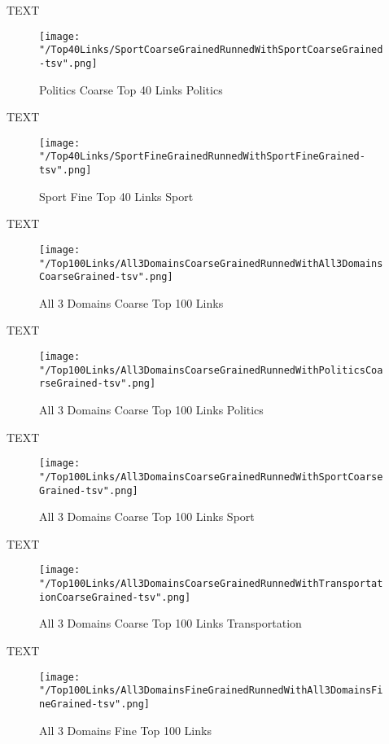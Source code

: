\documentclass[thesis=M,english]{FITthesis}[2012/10/20]
\begin{document}
	
	TEXT

	\begin{figure}\centering
		\texttt{[image: "/Top40Links/SportCoarseGrainedRunnedWithSportCoarseGrained-tsv".png]}
		\caption{Politics Coarse Top 40 Links Politics}\label{}
	\end{figure}		
	
		TEXT	

	\begin{figure}\centering
		\texttt{[image: "/Top40Links/SportFineGrainedRunnedWithSportFineGrained-tsv".png]}
		\caption{Sport Fine Top 40 Links Sport}\label{}	
	\end{figure}	

	TEXT

	\begin{figure}\centering
		\texttt{[image: "/Top100Links/All3DomainsCoarseGrainedRunnedWithAll3DomainsCoarseGrained-tsv".png]}
		\caption{All 3 Domains Coarse Top 100 Links}\label{}
	\end{figure}

	TEXT

	\begin{figure}\centering
		\texttt{[image: "/Top100Links/All3DomainsCoarseGrainedRunnedWithPoliticsCoarseGrained-tsv".png]}
		\caption{All 3 Domains Coarse Top 100 Links Politics}\label{}
	\end{figure}	

	TEXT	

	\begin{figure}\centering
		\texttt{[image: "/Top100Links/All3DomainsCoarseGrainedRunnedWithSportCoarseGrained-tsv".png]}
		\caption{All 3 Domains Coarse Top 100 Links Sport}\label{}
	\end{figure}
	
		TEXT	

	\begin{figure}\centering
		\texttt{[image: "/Top100Links/All3DomainsCoarseGrainedRunnedWithTransportationCoarseGrained-tsv".png]}
		\caption{All 3 Domains Coarse Top 100 Links Transportation}\label{}	
	\end{figure}
		
		TEXT	

	\begin{figure}\centering
		\texttt{[image: "/Top100Links/All3DomainsFineGrainedRunnedWithAll3DomainsFineGrained-tsv".png]}
		\caption{All 3 Domains Fine Top 100 Links }\label{}	
	\end{figure}
	
\end{document}
